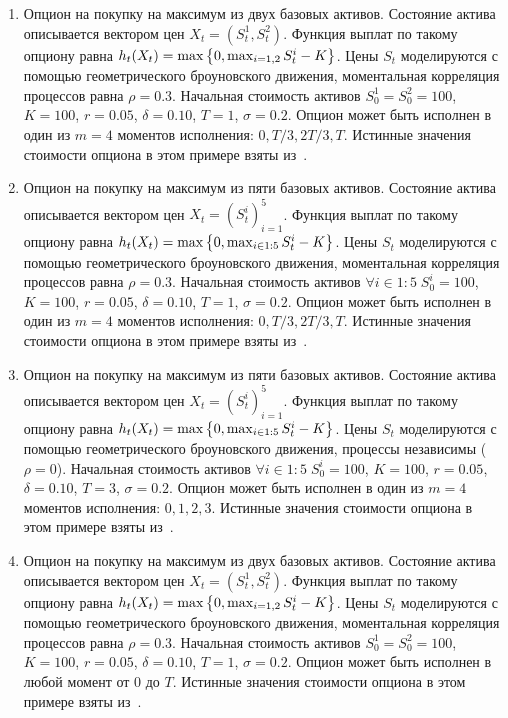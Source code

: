 \begin{enumerate}[label={П\arabic*}, align=right]
	\item\label{example_1} Опцион на покупку на максимум из двух базовых активов. Состояние актива описывается вектором цен $X_t = \left(S_t^1, S_t^2\right)$. Функция выплат по такому опциону равна $h_t(X_t) = \max\left\lbrace0, \max_{i=1,2}S_t^i - K\right\rbrace$. Цены $S_t$ моделируются с помощью геометрического броуновского движения, моментальная корреляция процессов равна $\rho=0.3$. Начальная стоимость активов $S^1_0 = S^2_0 = 100$, $K = 100$, $r = 0.05$, $\delta = 0.10$, $T=1$, $\sigma=0.2$. Опцион может быть исполнен в один из $m=4$ моментов исполнения: $0, T/3, 2T/3, T$. Истинные значения стоимости опциона в этом примере взяты из~\cite[стр.\,1340]{Broadie1997}.

	\item\label{example_2} Опцион на покупку на максимум из пяти базовых активов. Состояние актива описывается вектором цен $X_t = \left(S_t^i\right)_{i=1}^5$. Функция выплат по такому опциону равна $h_t(X_t) = \max\left\lbrace0, \max_{i\in{1\mathbin{:}5}}S_t^i - K\right\rbrace$. Цены $S_t$ моделируются с помощью геометрического броуновского движения, моментальная корреляция процессов равна $\rho=0.3$. Начальная стоимость активов $\forall i\in{1\mathbin{:}5}\;S^i_0 = 100$, $K = 100$, $r = 0.05$, $\delta = 0.10$, $T=1$, $\sigma=0.2$. Опцион может быть исполнен в один из $m=4$ моментов исполнения: $0, T/3, 2T/3, T$. Истинные значения стоимости опциона в этом примере взяты из~\cite[стр.\,1340]{Broadie1997}.

	\item\label{example_3} Опцион на покупку на максимум из пяти базовых активов. Состояние актива описывается вектором цен $X_t = \left(S_t^i\right)_{i=1}^5$. Функция выплат по такому опциону равна $h_t(X_t) = \max\left\lbrace0, \max_{i\in{1\mathbin{:}5}}S_t^i - K\right\rbrace$. Цены $S_t$ моделируются с помощью геометрического броуновского движения, процессы независимы ($\rho=0$). Начальная стоимость активов $\forall i\in{1\mathbin{:}5}\;S^i_0 = 100$, $K = 100$, $r = 0.05$, $\delta = 0.10$, $T=3$, $\sigma=0.2$. Опцион может быть исполнен в один из $m=4$ моментов исполнения: $0, 1, 2, 3$. Истинные значения стоимости опциона в этом примере взяты из~\cite{Broadie2004}.

	\item\label{example_4} Опцион на покупку на максимум из двух базовых активов. Состояние актива описывается вектором цен $X_t = \left(S_t^1, S_t^2\right)$. Функция выплат по такому опциону равна $h_t(X_t) = \max\left\lbrace0, \max_{i=1,2}S_t^i - K\right\rbrace$. Цены $S_t$ моделируются с помощью геометрического броуновского движения, моментальная корреляция процессов равна $\rho=0.3$. Начальная стоимость активов $S^1_0 = S^2_0 = 100$, $K = 100$, $r = 0.05$, $\delta = 0.10$, $T=1$, $\sigma=0.2$. Опцион может быть исполнен в любой момент от 0 до $T$. Истинные значения стоимости опциона в этом примере взяты из~\cite[стр.\,1342]{Broadie1997}.
\end{enumerate}

